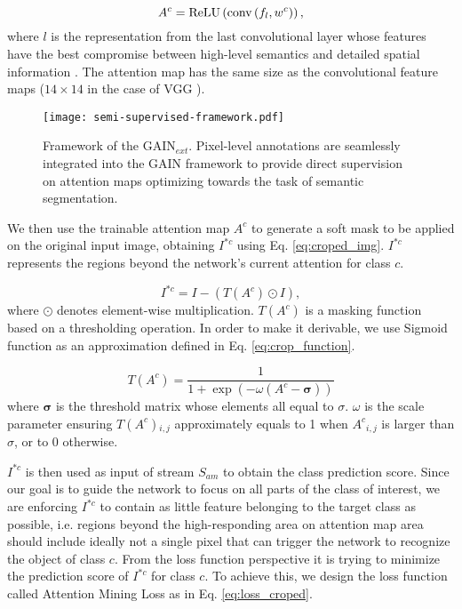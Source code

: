 \documentclass[10pt,twocolumn,letterpaper]{article}
\begin{document}
\begin{equation}
\label{eq:attention_map}
{A^c} = {\mathop{\rm ReLU}\nolimits} \left( {{\mathop{\rm conv}\nolimits} \left( {{f_l},{w^c}} \right)} \right),
\end{equation}
where $l$ is the representation from the last convolutional layer whose features have the best compromise between high-level semantics and detailed spatial information \cite{simonyan2013deep}. The attention map has the same size as the convolutional feature maps ($14 \times 14$ in the case of VGG \cite{simonyan2014very}).


\begin{figure*}%
\centering
\texttt{[image: semi-supervised-framework.pdf]} %
\caption{Framework of the GAIN$_{ext}$. Pixel-level annotations are seamlessly integrated into the GAIN framework to provide direct supervision on attention maps optimizing towards the task of semantic segmentation.}
\label{fig:human_supervised}
\end{figure*}

We then use the trainable attention map $A^c$ to generate a soft mask to be applied on the original input image, obtaining $I^ {*c}$ using Eq. \ref{eq:croped_img}. $I^ {*c}$ represents the regions beyond the network's current attention for class $c$.



\begin{equation}
\label{eq:croped_img}
{I^ {*c} } = I - \left( T\left( {{A^c}} \right) \odot I \right),
\end{equation}
where $\odot$ denotes element-wise multiplication. $T\left( {{A^c}} \right)$ is a masking function based on a thresholding operation. In order to make it derivable, we use Sigmoid function as an approximation defined in Eq. \ref{eq:crop_function}.

\begin{equation}
\label{eq:crop_function}
T\left( {{A^c}} \right) = \frac{1}{{1 + \exp \left( { - \omega \left( {{A^c} -  \boldsymbol{\sigma} } \right)} \right)}}
\end{equation}
where $\boldsymbol{\sigma}$ is the threshold matrix whose elements all equal to $\sigma$. $\omega$ is the scale parameter ensuring $T\left( {{A^c}} \right){}_{i,j}$ approximately equals to 1 when ${A^c}_{i,j}$ is larger than $\sigma$, or to 0 otherwise.



$I^ {*c}$ is then used as input of stream ${S_{am}}$ to obtain the class prediction score. Since our goal is to guide the network to focus on all parts of the class of interest, we are enforcing $I^ {*c}$ to contain as little feature belonging to the target class as possible, i.e. regions beyond the high-responding area on attention map area should include ideally not a single pixel that can trigger the network to recognize the object of class $c$. From the loss function perspective it is trying to minimize the prediction score of $I^ {*c}$ for class $c$. To achieve this, we design the loss function called Attention Mining Loss as in Eq. \ref{eq:loss_croped}.
\end{document}

